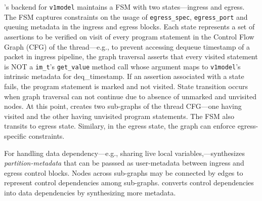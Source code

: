 \documentclass[letterpaper,twocolumn,10pt]{article}
\begin{document}
\ucomp's backend for \texttt{v1model} maintains a FSM with two
states---ingress and egress. The FSM captures constraints on the usage
of \texttt{egress\_spec}, \texttt{egress\_port} and queuing metadata
in the ingress and egress blocks. Each state represents a set of
assertions to be verified on visit of every program statement in the
Control Flow Graph (CFG) of the thread---e.g., to prevent accessing
dequeue timestamp of a packet in ingress pipeline, the graph traversal
asserts that every visited statement is NOT a \texttt{im\_t}'s
\texttt{get\_value} method call whose argument maps to
\texttt{v1model}'s intrinsic metadata for deq\_timestamp.  If an
assertion associated with a state fails, the program statement is
marked and not visited. State transition occurs when graph
traversal can not continue due to absence of unmarked and
unvisited nodes. At this point, \ucomp creates two sub-graphs of the
thread CFG---one having visited and the other having unvisited program
statements. The FSM also transits to egress state. Similary, in the egress
state, the graph can enforce egress-specific constraints.

For handling data dependency---e.g., sharing live local
variables,---\ucomp synthesizes \emph{partition-metadata} that can be
passsed as user-metadata between ingress and egress control blocks.
Nodes across sub-graphs may be connected by edges to represent control
dependencies among sub-graphs. \ucomp converts control dependencies into data
dependencies by synthesizing more metadata.






\end{document}
